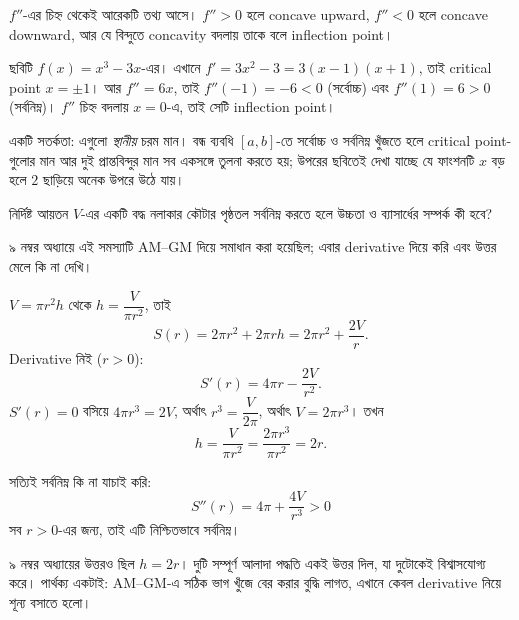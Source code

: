 \documentclass[11pt]{article}
\begin{document}
$f''$-এর চিহ্ন থেকেই আরেকটি তথ্য আসে। $f'' > 0$ হলে concave upward,
$f'' < 0$ হলে concave downward, আর যে বিন্দুতে concavity বদলায় তাকে বলে
inflection point।

\begin{center}
\end{center}

ছবিটি $f(x) = x^{3} - 3x$-এর। এখানে $f' = 3x^{2}-3 = 3(x-1)(x+1)$, তাই critical
point $x = \pm 1$। আর $f'' = 6x$, তাই $f''(-1) = -6 < 0$ (সর্বোচ্চ) এবং
$f''(1) = 6 > 0$ (সর্বনিম্ন)। $f'' $ চিহ্ন বদলায় $x = 0$-এ, তাই সেটি
inflection point।

একটি সতর্কতা: এগুলো \emph{স্থানীয়} চরম মান। বন্ধ ব্যবধি $[a,b]$-তে সর্বোচ্চ ও
সর্বনিম্ন খুঁজতে হলে critical point-গুলোর মান আর দুই প্রান্তবিন্দুর মান সব
একসঙ্গে তুলনা করতে হয়; উপরের ছবিতেই দেখা যাচ্ছে যে ফাংশনটি $x$ বড় হলে
$2$ ছাড়িয়ে অনেক উপরে উঠে যায়।

\begin{example}
নির্দিষ্ট আয়তন $V$-এর একটি বদ্ধ নলাকার কৌটার পৃষ্ঠতল সর্বনিম্ন করতে হলে উচ্চতা
ও ব্যাসার্ধের সম্পর্ক কী হবে?
\end{example}

\begin{solbox}
৯ নম্বর অধ্যায়ে এই সমস্যাটি AM--GM দিয়ে সমাধান করা হয়েছিল; এবার
derivative দিয়ে করি এবং উত্তর মেলে কি না দেখি।

$V = \pi r^{2}h$ থেকে $h = \dfrac{V}{\pi r^{2}}$, তাই
\[
  S(r) = 2\pi r^{2} + 2\pi r h = 2\pi r^{2} + \frac{2V}{r} .
\]
Derivative নিই ($r > 0$):
\[
  S'(r) = 4\pi r - \frac{2V}{r^{2}} .
\]
$S'(r) = 0$ বসিয়ে $4\pi r^{3} = 2V$, অর্থাৎ $r^{3} = \dfrac{V}{2\pi}$, অর্থাৎ
$V = 2\pi r^{3}$। তখন
\[
  h = \frac{V}{\pi r^{2}} = \frac{2\pi r^{3}}{\pi r^{2}} = 2r .
\]

সত্যিই সর্বনিম্ন কি না যাচাই করি:
\[
  S''(r) = 4\pi + \frac{4V}{r^{3}} > 0
\]
সব $r>0$-এর জন্য, তাই এটি নিশ্চিতভাবে সর্বনিম্ন।

৯ নম্বর অধ্যায়ের উত্তরও ছিল $h = 2r$। দুটি সম্পূর্ণ আলাদা পদ্ধতি একই উত্তর
দিল, যা দুটোকেই বিশ্বাসযোগ্য করে। পার্থক্য একটাই: AM--GM-এ সঠিক ভাগ খুঁজে বের
করার বুদ্ধি লাগত, এখানে কেবল derivative নিয়ে শূন্য বসাতে হলো।
\end{solbox}
\end{document}
